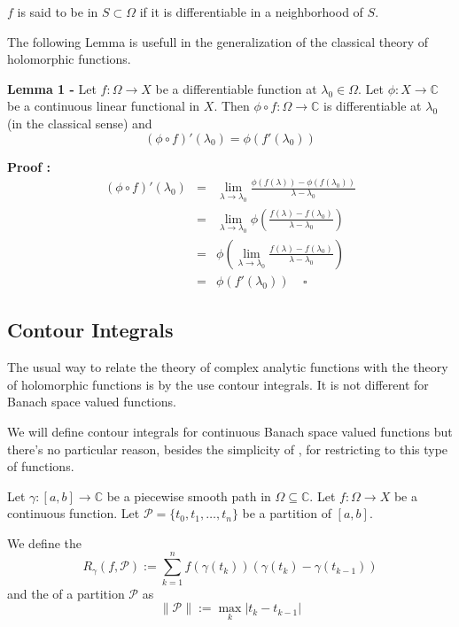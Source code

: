 \documentclass[12pt]{article}
\begin{document}
$f$ is said to be {\bf {}} in $S \subset \Omega$ if it is differentiable in a neighborhood of $S$.

The following Lemma is usefull in the generalization of the classical theory of holomorphic functions.

{\bf Lemma 1 -} Let $f : \Omega \longrightarrow X$ be a differentiable function at $\lambda_0 \in \Omega$. Let $\phi: X \longrightarrow \mathbb{C}$ be a continuous linear functional in $X$. Then $\phi \circ f : \Omega \longrightarrow \mathbb{C}$ is differentiable at $\lambda_0$ (in the classical sense) and 
\begin{displaymath}
(\phi \circ f)'(\lambda_0) = \phi(f'(\lambda_0))
\end{displaymath}

{\bf Proof :}
\begin{eqnarray*}
(\phi \circ f)'(\lambda_0) & = & \lim_{\lambda \rightarrow \lambda_0} \frac{\phi (f(\lambda))- \phi (f(\lambda_0))}{\lambda - \lambda_0} \\ 
& = & \lim_{\lambda \rightarrow \lambda_0} \phi \left(\frac{f(\lambda)- f(\lambda_0)}{\lambda - \lambda_0}\right) \\
& = & \phi \left(\lim_{\lambda \rightarrow \lambda_0} \frac{f(\lambda)- f(\lambda_0)}{\lambda - \lambda_0}\right) \\
& = & \phi (f'(\lambda_0))\;\;\;\;\square
\end{eqnarray*}

\subsection{Contour Integrals}

The usual way to relate the theory of complex analytic functions with the theory of holomorphic functions is by the use contour integrals. It is not different for Banach space valued functions.

We will define contour integrals for continuous Banach space valued functions but there's no particular reason, besides the simplicity of , for restricting to this type of functions.

Let $\gamma : [a,b] \longrightarrow \mathbb{C}$ be a piecewise smooth path in $\Omega \subseteq \mathbb{C}$.
Let $f : \Omega \longrightarrow X$ be a continuous function. Let $\mathcal{P} = \{t_0, t_1, \dots, t_n\}$ be a partition of $[a,b]$.

We define the {\bf {}}
\begin{displaymath}
R_{\gamma}(f, \mathcal{P}) := \sum_{k=1}^n f(\gamma(t_k))(\gamma(t_k)-\gamma(t_{k-1}))
\end{displaymath}
and the {\bf {}} of a partition $\mathcal{P}$ as
\begin{displaymath}
\|\mathcal{P}\| :=\max_k |t_k - t_{k-1}|
\end{displaymath}
\end{document}
